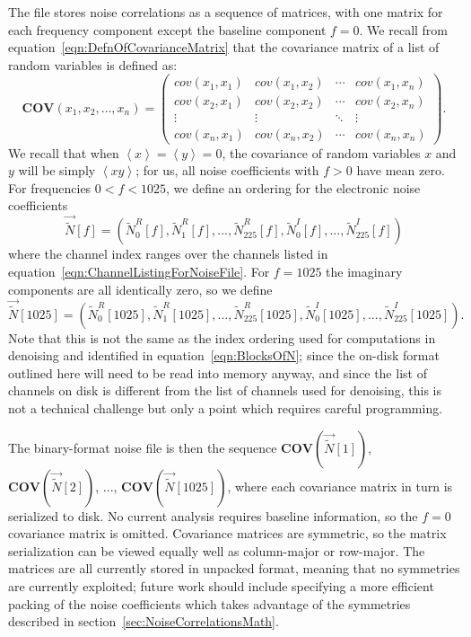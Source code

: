 The file stores noise correlations as a sequence of matrices, with one matrix for each frequency component except the baseline component $f = 0$.  We recall from equation~\ref{eqn:DefnOfCovarianceMatrix} that the covariance matrix of a list of random variables is defined as:
\begin{equation}
\mathbf{COV}\left( x_1, x_2, \dots, x_n \right) = \begin{pmatrix}
  cov(x_1, x_1) & cov(x_1, x_2) & \cdots & cov(x_1, x_n) \\
  cov(x_2, x_1) & cov(x_2, x_2) & \cdots & cov(x_2, x_n) \\
  \vdots & \vdots & \ddots & \vdots \\
  cov(x_n, x_1) & cov(x_n, x_2) & \cdots & cov(x_n, x_n)
\end{pmatrix}. \end{equation}
We recall that when $\left<x\right> = \left<y\right> = 0$, the covariance of random variables $x$ and $y$ will be simply $\left<xy\right>$; for us, all noise coefficients with $f > 0$ have mean zero.  For frequencies $0 < f < 1025$, we define an ordering for the electronic noise coefficients
\begin{equation}
\vec{\widetilde{N}}[f] = \left(\widetilde{N}^R_0[f], \widetilde{N}^R_1[f], ..., \widetilde{N}^R_{225}[f], \widetilde{N}^I_0[f], ..., \widetilde{N}^I_{225}[f]\right)
\end{equation}
where the channel index ranges over the channels listed in equation~\ref{eqn:ChannelListingForNoiseFile}.  For $f = 1025$ the imaginary components are all identically zero, so we define
\begin{equation}
\vec{\widetilde{N}}[1025] = \left(\widetilde{N}^R_0[1025], \widetilde{N}^R_1[1025], ..., \widetilde{N}^R_{225}[1025], \widetilde{N}^I_0[1025], ..., \widetilde{N}^I_{225}[1025]\right).
\end{equation}
Note that this is not the same as the index ordering used for computations in denoising and identified in equation~\ref{eqn:BlocksOfN}; since the on-disk format outlined here will need to be read into memory anyway, and since the list of channels on disk is different from the list of channels used for denoising, this is not a technical challenge but only a point which requires careful programming.

The binary-format noise file is then the sequence $\mathbf{COV}\left(\vec{\widetilde{N}}[1]\right)$, $\mathbf{COV}\left(\vec{\widetilde{N}}[2]\right)$, ..., $\mathbf{COV}\left(\vec{\widetilde{N}}[1025]\right)$, where each covariance matrix in turn is serialized to disk.  No current analysis requires baseline information, so the $f=0$ covariance matrix is omitted. Covariance matrices are symmetric, so the matrix serialization can be viewed equally well as column-major or row-major.  The matrices are all currently stored in unpacked format, meaning that no symmetries are currently exploited; future work should include specifying a more efficient packing of the noise coefficients which takes advantage of the symmetries described in section~\ref{sec:NoiseCorrelationsMath}.


